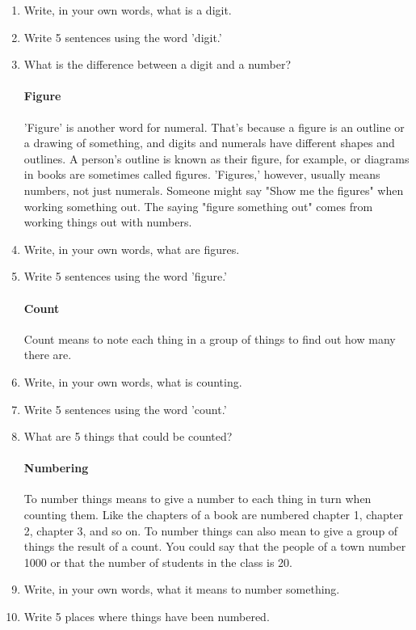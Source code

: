 \documentclass[12pt]{article}
\begin{document}
\begin{enumerate}
\item Write, in your own words, what is a digit.
\item Write 5 sentences using the word 'digit.'
\item What is the difference between a digit and a number?

\paragraph{Figure}
'Figure' is another word for numeral. That's because a figure is an outline or a drawing of something, and digits and numerals have different shapes and outlines. A person's outline is known as their figure, for example, or diagrams in books are sometimes called figures. 'Figures,' however, usually means numbers, not just numerals. Someone might say "Show me the figures" when working something out. The saying "figure something out" comes from working things out with numbers.

\item Write, in your own words, what are figures.
\item Write 5 sentences using the word 'figure.'

\paragraph{Count}
Count means to note each thing in a group of things to find out how many there are.

\item Write, in your own words, what is counting.
\item Write 5 sentences using the word 'count.'
\item What are 5 things that could be counted?

\paragraph{Numbering} To number things means to give a number to each thing in turn when counting them. Like the chapters of a book are numbered chapter 1, chapter 2, chapter 3, and so on. To number things can also mean to give a group of things the result of a count. You could say that the people of a town number 1000 or that the number of students in the class is 20.

\item Write, in your own words, what it means to number something.
\item Write 5 places where things have been numbered.


\end{enumerate}
\end{document}

